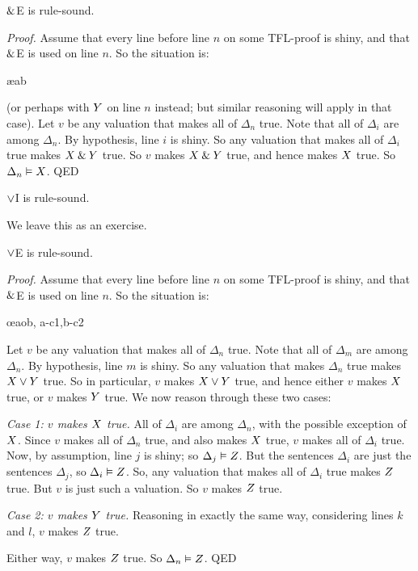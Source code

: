 \begin{highlighted}$\mathbin{\&}$E is rule-sound.
\end{highlighted}

\emph{Proof.}
	Assume that every line before line $n$ on some TFL-proof is shiny, and that $\mathbin{\&}$E is used on line $n$. So the situation is:
		   \begin{pf}
			    \ae{ab}
		   \end{pf}\noindent
(or perhaps with $Y$ on line $n$ instead; but similar reasoning will apply in that case). Let $v$ be any valuation that makes all of $\Delta_{n}$ true. Note that all of $\Delta_i$ are among $\Delta_{n}$. By hypothesis, line $i$ is shiny. So any valuation that makes all of $\Delta_i$ true makes $X\mathbin{\&}Y$ true. So $v$ makes $X\mathbin{\&}Y$ true, and hence makes $X$ true. So $\Delta_{n} \vDash X$. QED


\begin{highlighted}$\vee$I is rule-sound.
\end{highlighted}

We leave this as an exercise.

\begin{highlighted}$\vee$E is rule-sound.
\end{highlighted}

\emph{Proof.}
	Assume that every line before line $n$ on some TFL-proof is shiny, and that $\mathbin{\&}$E is used on line $n$. So the situation is:
   \begin{pf}
	   \have[m]{aob}{\metaX\eor\metaY}
	   \open
		   \have[j]{c1}{\metaZ}
	   \close
	   \open
		   \have[l]{c2}{\metaZ}
	   \close
	   \oe{aob, a-c1,b-c2}
   \end{pf}\noindent
Let $v$ be any valuation that makes all of $\Delta_{n}$ true. Note that all of $\Delta_m$ are among $\Delta_{n}$. By hypothesis, line $m$ is shiny. So any valuation that makes $\Delta_{n}$ true makes $X \vee Y$ true. So in particular, $v$ makes $X \vee Y$ true, and hence either $v$ makes $X$ true, or $v$ makes $Y$ true. We now reason through these two cases:
   \begin{ebullet}
	   \item[\emph{Case 1: $v$ makes $X$ true.}] All of $\Delta_i$ are among $\Delta_{n}$, with the possible exception of $X$. Since $v$ makes all of $\Delta_{n}$ true, and also makes $X$ true,  $v$ makes all of $\Delta_i$ true. Now, by assumption, line $j$ is shiny; so $\Delta_{j} \vDash Z$. But the sentences $\Delta_i$ are just the sentences $\Delta_{j}$, so $\Delta_i \vDash Z$. So, any valuation that makes all of $\Delta_i$ true makes $Z$ true. But $v$ is just such a valuation. So $v$ makes $Z$ true.
	   \item[\emph{Case 2: $v$ makes $Y$ true.}] Reasoning in exactly the same way, considering lines $k$ and $l$, $v$ makes $Z$ true.
	   \end{ebullet}
Either way, $v$ makes $Z$ true. So $\Delta_n \vDash Z$.
QED


